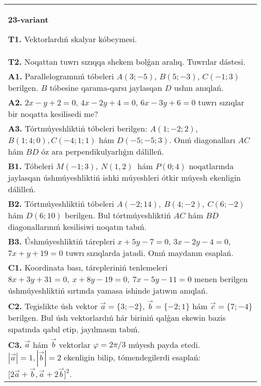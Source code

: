 \documentclass{article}
\begin{document}
\begin{tabular}{m{17cm}}
\textbf{23-variant}

\textbf{T1.} 
Vektorlardıń skalyar kóbeymesi.
 \\
\textbf{T2.} 
Noqattan tuwrı sızıqqa shekem bolǵan aralıq. Tuwrılar dástesi.
 \\
\textbf{A1.} 
Parallelogramnıń tóbeleri
$A (3;-5) $, $B (5;-3) $, $C (-1;3) $ berilgen. $B$ tóbesine
qarama-qarsı jaylasqan $D$ ushın anıqlań.
 \\
\textbf{A2.} 
$2x-y+2=0$, $4x-2y+4=0$, $6x-3y+6=0$
tuwrı sızıqlar bir noqatta kesilisedi me?
 \\
\textbf{A3.} 
Tórtmúyeshliktiń tóbeleri berilgen:
$A (1; - 2;2) $, $B (1;4;0),C (- 4;1;1) $ hám $D (- 5; -5;3) $. Onıń diagonalları $AC$ hám $BD$ óz ara
perpendikulyarlıǵın dálilleń.
 \\
\textbf{B1.} 
Tóbeleri \(M (-1;3),\ N (1,2) \ \) hám \(P (0;4) \)
noqatlarında jaylasqan úshmúyeshliktiń ishki múyeshleri ótkir múyesh
ekenligin dálilleń.
 \\
\textbf{B2.} 
Tórtmúyeshliktiń tóbeleri
\(A (-2;14),\ B (4;-2),\ C (6;-2) \) hám \(D (6;10) \) berilgen. Bul
tórtmúyeshliktiń $AC$ hám $BD$ diagonallarınıń kesilisiwi
noqatın tabıń.
 \\
\textbf{B3.} 
Úshmúyeshliktiń tárepleri \(x+5y-7=0\),
\(3x-2y-4=0\), \(7x+y+19=0\) tuwrı sızıqlarda jatadi. Onıń
maydanın esaplań.
 \\
\textbf{C1.} 
Koordinata bası, tárepleriniń tenlemeleri
\(8x+3y+31=0,\ x+8y-19=0,\ 7x-5y-11=0\) menen
berilgen úshmúyeshliktiń sırtında yamasa ishinde jatıwın anıqlań.
 \\
\textbf{C2.} 
Tegislikte úsh vektor $\vec{a} = \{ 3; - 2\}$, $\vec{b} = \{ - 2;1\}$ hám $\vec{c} = \{ 7; - 4\}$ berilgen. Bul úsh vektorlardıń hár biriniń qalǵan ekewin bazis sıpatında qabıl etip, jayılmasın tabıń.
 \\
\textbf{C3.} 
$\vec{a}$ hám $\vec{b}$ vektorlar $\varphi = 2\pi/3$ múyesh payda etedi. $|\vec{a}| = 1,|\vec{b}| = 2$ ekenligin bilip, tómendegilerdi esaplań:
$\lbrack 2\overrightarrow{a} + \overrightarrow{b},\overrightarrow{a} + 2\overrightarrow{b}\rbrack^{2}$.
 \\

\end{tabular}
\vspace{1cm}
\end{document}
